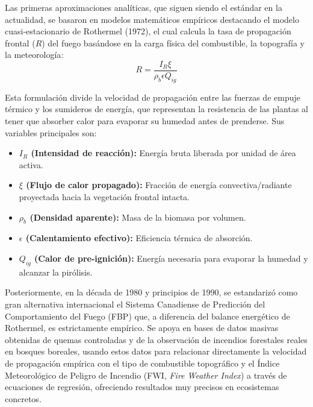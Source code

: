     Las primeras aproximaciones analíticas, que siguen siendo el estándar en la actualidad, se basaron en modelos matemáticos empíricos destacando el modelo cuasi-estacionario de Rothermel (1972), el cual calcula la tasa de propagación frontal ($R$) del fuego basándose en la carga física del combustible, la topografía y la meteorología\cite{rothermel1972}:\\

    $$R = \frac{I_R \xi}{\rho_b \epsilon Q_{ig}}$$

    Esta formulación divide la velocidad de propagación entre las fuerzas de empuje térmico y los sumideros de energía, que representan la resistencia de las plantas al tener que absorber calor para evaporar su humedad antes de prenderse. Sus variables principales son:
    \begin{itemize}
        \item \textbf{$I_R$ (Intensidad de reacción):} Energía bruta liberada por unidad de área activa.
        \item \textbf{$\xi$ (Flujo de calor propagado):} Fracción de energía convectiva/radiante proyectada hacia la vegetación frontal intacta.
        \item \textbf{$\rho_b$ (Densidad aparente):} Masa de la biomasa por volumen.
        \item \textbf{$\epsilon$ (Calentamiento efectivo):} Eficiencia térmica de absorción.
        \item \textbf{$Q_{ig}$ (Calor de pre-ignición):} Energía necesaria para evaporar la humedad y alcanzar la pirólisis.
    \end{itemize}


    Posteriormente, en la década de 1980 y principios de 1990, se estandarizó como gran alternativa internacional el Sistema Canadiense de Predicción del Comportamiento del Fuego (FBP) que, a diferencia del balance energético de Rothermel, es estrictamente empírico. Se apoya en bases de datos masivas obtenidas de quemas controladas y de la observación de incendios forestales reales en bosques boreales, usando estos datos para relacionar directamente la velocidad de propagación empírica con el tipo de combustible topográfico y el Índice Meteorológico de Peligro de Incendio (FWI, \textit{Fire Weather Index}) a través de ecuaciones de regresión, ofreciendo resultados muy precisos en ecosistemas concretos\cite{hirsch_1996_fbp}\cite{fbp}.\\

